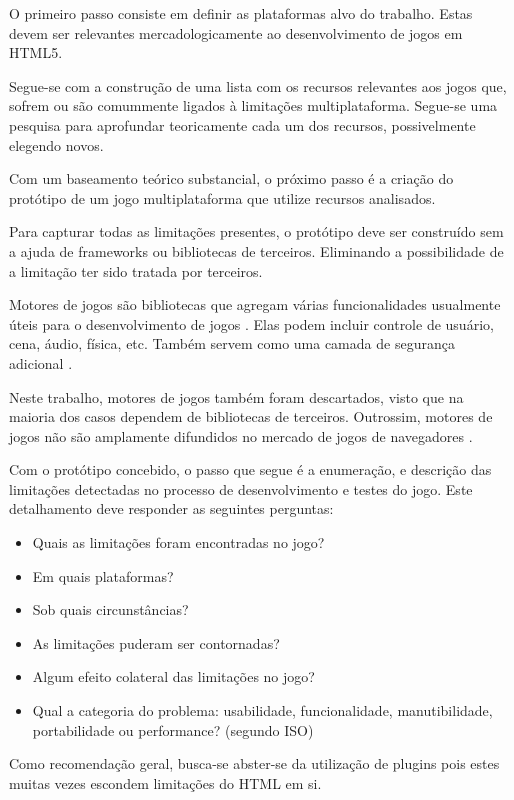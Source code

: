 \documentclass[
12pt,
a4paper,
portuges,
draft
]{report}
\begin{document}
O primeiro passo consiste em definir as plataformas alvo do trabalho.
Estas devem ser relevantes mercadologicamente ao desenvolvimento de jogos em HTML5.

Segue-se com a construção de uma lista com os recursos relevantes
aos jogos que, sofrem ou são comummente ligados à
limitações multiplataforma. Segue-se uma pesquisa para aprofundar
teoricamente cada um dos recursos, possivelmente elegendo novos.

Com um baseamento teórico substancial, o próximo passo é a criação
do protótipo de um jogo multiplataforma que utilize recursos
analisados.

Para capturar todas as limitações presentes, o protótipo deve ser
construído sem a ajuda de frameworks ou bibliotecas de terceiros.
Eliminando a possibilidade de a limitação ter sido tratada por
terceiros.

Motores de jogos são bibliotecas que agregam várias funcionalidades
usualmente úteis para o desenvolvimento de jogos \autocite[pp.
5]{browserGamesTechnologyAndFuture}. Elas podem incluir controle
de usuário, cena, áudio, física, etc. Também servem como uma camada de 
segurança adicional \autocite{browserGamesTechnologyAndFuture}.

Neste trabalho, motores de jogos também foram descartados, visto que
na maioria dos casos dependem de bibliotecas de terceiros. Outrossim,
motores de jogos não são amplamente difundidos no mercado de jogos de
navegadores \autocite{browserGamesTechnologyAndFuture}.

Com o protótipo concebido, o passo que segue é a enumeração, e
descrição das limitações detectadas no processo de desenvolvimento e
testes do jogo. Este detalhamento deve responder as seguintes perguntas:

\begin{itemize}
\item Quais as limitações foram encontradas no jogo?
\item Em quais plataformas?
\item Sob quais circunstâncias?
\item As limitações puderam ser contornadas?
\item Algum efeito colateral das limitações no jogo?
\item Qual a categoria do problema: usabilidade, funcionalidade, manutibilidade, portabilidade ou performance? (segundo ISO)
\end{itemize}

Como recomendação geral, busca-se abster-se da utilização de plugins
pois estes muitas vezes escondem limitações do HTML em si.
\end{document}
